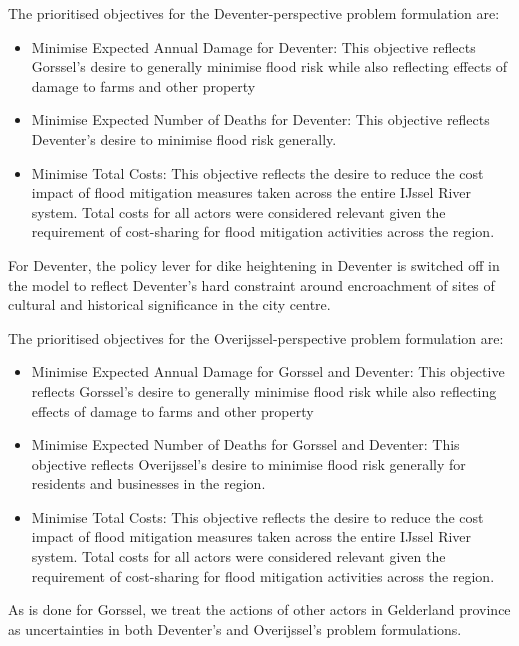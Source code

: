 \smallskip  

The prioritised objectives for the Deventer-perspective problem formulation are:
\begin{itemize}
    \item Minimise Expected Annual Damage for Deventer: This objective reflects Gorssel's desire to generally minimise flood risk while also reflecting effects of damage to farms and other property
    \item Minimise Expected Number of Deaths for Deventer: This objective reflects Deventer's desire to minimise flood risk generally.
    \item Minimise Total Costs: This objective reflects the desire to reduce the cost impact of flood mitigation measures taken across the entire IJssel River system. Total costs for all actors were considered relevant given the requirement of cost-sharing for flood mitigation activities across the region.
\end{itemize}
For Deventer, the policy lever for dike heightening in Deventer is switched off in the model to reflect Deventer's hard constraint around encroachment of sites of cultural and historical significance in the city centre.

The prioritised objectives for the Overijssel-perspective problem formulation are:
\begin{itemize}
    \item Minimise Expected Annual Damage for Gorssel and Deventer: This objective reflects Gorssel's desire to generally minimise flood risk while also reflecting effects of damage to farms and other property
    \item Minimise Expected Number of Deaths for Gorssel and Deventer: This objective reflects Overijssel's desire to minimise flood risk generally for residents and businesses in the region.
    \item Minimise Total Costs: This objective reflects the desire to reduce the cost impact of flood mitigation measures taken across the entire IJssel River system. Total costs for all actors were considered relevant given the requirement of cost-sharing for flood mitigation activities across the region.
\end{itemize}

\noindent As is done for Gorssel, we treat the actions of other actors in Gelderland province as uncertainties in both Deventer's and Overijssel's problem formulations.